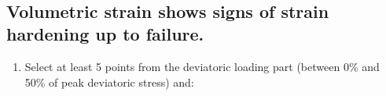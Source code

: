 \documentclass[11pt]{article}
\providecommand{\tightlist}{%
      \setlength{\itemsep}{0pt}\setlength{\parskip}{0pt}}
\begin{document}
    \begin{center}
    \end{center}
    { \hspace*{\fill} \\}
    
    \hypertarget{volumetric-strain-shows-signs-of-strain-hardening-up-to-failure.}{%
\subsection{Volumetric strain shows signs of strain hardening up to
failure.}\label{volumetric-strain-shows-signs-of-strain-hardening-up-to-failure.}}

    \begin{enumerate}
\def\labelenumi{(\alph{enumi})}
\setcounter{enumi}{2}
\tightlist
\item
  Select at least 5 points from the deviatoric loading part (between 0\%
  and 50\% of peak deviatoric stress) and:
\end{enumerate}
\end{document}
